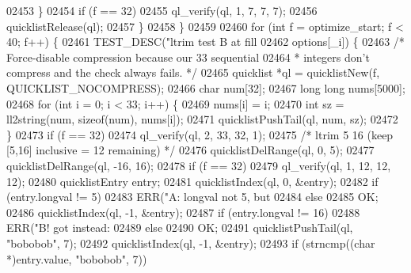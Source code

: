 \begin{DoxyCode}
{{{{{{{{{{{{{{{{{{{{{{{{{{{{{{{{{{{{{{{{{{{{{{{{{{{{{{{{{{{{{{{{{{{{{{{{{{{{{{{{{{{{{{{{{{{{{02453                 \}
02454                 \textcolor{keywordflow}{if} (f == 32)
02455                     ql\_verify(ql, 1, 7, 7, 7);
02456                 quicklistRelease(ql);
02457             \}
02458         \}
02459 
02460         \textcolor{keywordflow}{for} (\textcolor{keywordtype}{int} f = optimize\_start; f < 40; f++) \{
02461             TEST\_DESC(\textcolor{stringliteral}{"ltrim test B at fill %
02462                       options[\_i]) \{
02463                 \textcolor{comment}{/* Force-disable compression because our 33 sequential}
02464 \textcolor{comment}{                 * integers don't compress and the check always fails. */}
02465                 quicklist *ql = quicklistNew(f, QUICKLIST\_NOCOMPRESS);
02466                 \textcolor{keywordtype}{char} num[32];
02467                 \textcolor{keywordtype}{long} \textcolor{keywordtype}{long} nums[5000];
02468                 \textcolor{keywordflow}{for} (\textcolor{keywordtype}{int} i = 0; i < 33; i++) \{
02469                     nums[i] = i;
02470                     \textcolor{keywordtype}{int} sz = ll2string(num, \textcolor{keyword}{sizeof}(num), nums[i]);
02471                     quicklistPushTail(ql, num, sz);
02472                 \}
02473                 \textcolor{keywordflow}{if} (f == 32)
02474                     ql\_verify(ql, 2, 33, 32, 1);
02475                 \textcolor{comment}{/* ltrim 5 16 (keep [5,16] inclusive = 12 remaining) */}
02476                 quicklistDelRange(ql, 0, 5);
02477                 quicklistDelRange(ql, -16, 16);
02478                 \textcolor{keywordflow}{if} (f == 32)
02479                     ql\_verify(ql, 1, 12, 12, 12);
02480                 quicklistEntry entry;
02481                 quicklistIndex(ql, 0, &entry);
02482                 \textcolor{keywordflow}{if} (entry.longval != 5)
02483                     ERR(\textcolor{stringliteral}{"A: longval not 5, but %
02484                 \textcolor{keywordflow}{else}
02485                     OK;
02486                 quicklistIndex(ql, -1, &entry);
02487                 \textcolor{keywordflow}{if} (entry.longval != 16)
02488                     ERR(\textcolor{stringliteral}{"B! got instead: %
02489                 \textcolor{keywordflow}{else}
02490                     OK;
02491                 quicklistPushTail(ql, \textcolor{stringliteral}{"bobobob"}, 7);
02492                 quicklistIndex(ql, -1, &entry);
02493                 \textcolor{keywordflow}{if} (strncmp((\textcolor{keywordtype}{char} *)entry.value, \textcolor{stringliteral}{"bobobob"}, 7))
}}}}}}}}}}}}}}}}}}}}}}}}}}}}}}}}}}}}}}}}}}}}}}}}}}}}}}}}}}}}}}}}}}}}}}}}}}}}}}}}}}}}}}}}}}}}}}}}
\end{DoxyCode}

